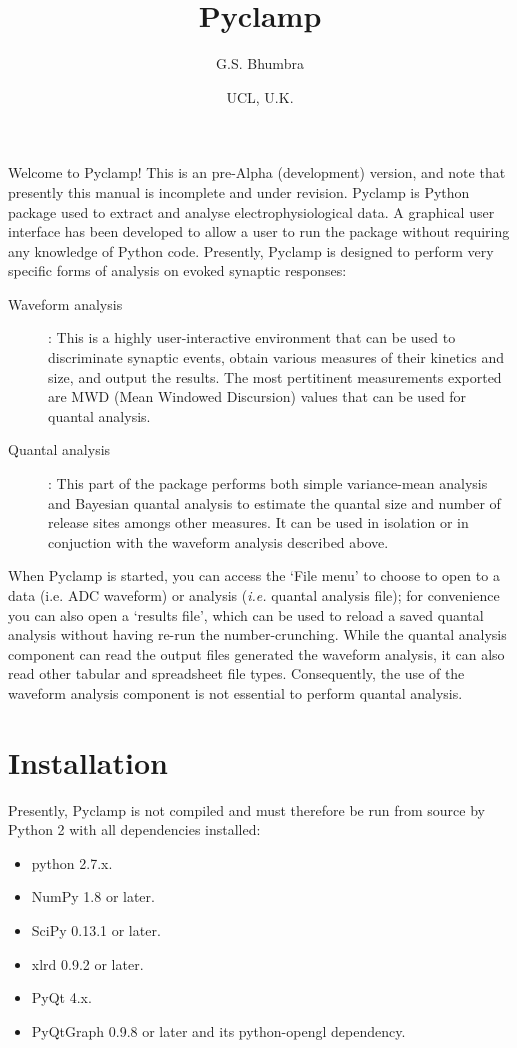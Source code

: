 \documentclass{article}
\title{Pyclamp}
\author{G.S. Bhumbra}
\date{UCL, U.K.}
\begin{document}
Welcome to Pyclamp! This is an pre-Alpha (development) version, and note that presently this manual is incomplete and
under revision. Pyclamp is Python package used to extract and analyse electrophysiological data. A graphical user
interface has been developed to allow a user to run the package without requiring any knowledge of Python code.
Presently, Pyclamp is designed to perform very specific forms of analysis on evoked synaptic responses:

\begin{description}
	\item[Waveform analysis]: This is a highly user-interactive environment that can be used to discriminate synaptic
		events, obtain various measures of their kinetics and size, and output the results. The most pertitinent
		measurements exported are MWD (Mean Windowed Discursion) values that can be used for quantal analysis.
	\item[Quantal analysis]: This part of the package performs both simple variance-mean analysis and Bayesian quantal
		analysis to estimate the quantal size and number of release sites amongs other measures. It can be used in isolation
		or in conjuction with the waveform analysis described above.
\end{description}

When Pyclamp is started, you can access the `File menu' to choose to open to a data (i.e. ADC waveform) or analysis
(\textit{i.e.} quantal analysis file); for convenience you can also open a `results file', which can be used to reload a
saved quantal analysis without having re-run the number-crunching. While the quantal analysis component can read the
output files generated the waveform analysis, it can also read other tabular and spreadsheet file types. Consequently,
the use of the waveform analysis component is not essential to perform quantal analysis.

\section{Installation}

Presently, Pyclamp is not compiled and must therefore be run from source by Python 2 with all dependencies installed:

\begin{itemize}
	\item python 2.7.x.
	\item NumPy 1.8 or later.
	\item SciPy 0.13.1 or later.
	\item xlrd 0.9.2 or later.
	\item PyQt 4.x.
	\item PyQtGraph 0.9.8 or later and its python-opengl dependency.
\end{itemize}
	
\end{document}
